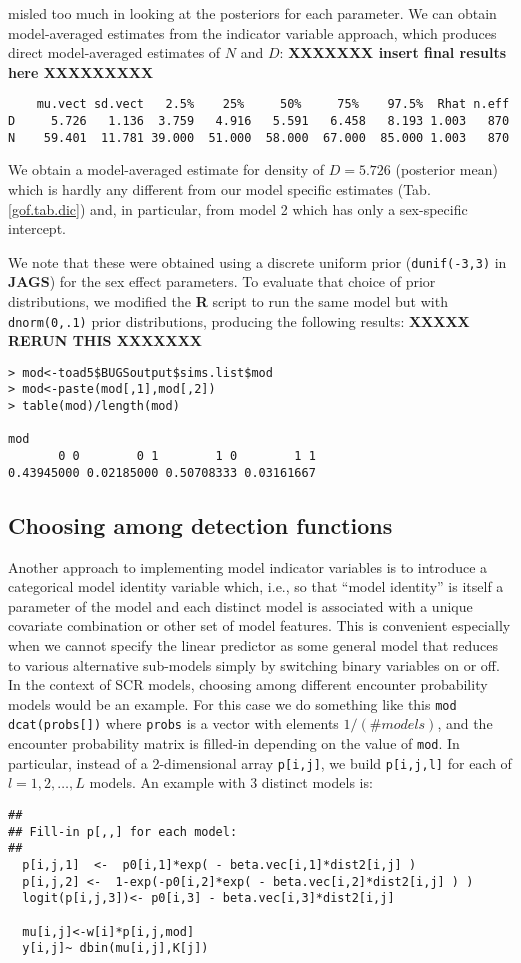 misled too much in looking at the posteriors for each parameter.
We can obtain model-averaged estimates from the indicator variable
approach, which 
 produces direct model-averaged estimates of $N$ and $D$: {\bf XXXXXXX
   insert final results here XXXXXXXXX}
{\small
\begin{verbatim}
    mu.vect sd.vect   2.5%    25%     50%     75%    97.5%  Rhat n.eff
D     5.726   1.136  3.759   4.916   5.591   6.458   8.193 1.003   870
N    59.401  11.781 39.000  51.000  58.000  67.000  85.000 1.003   870
\end{verbatim}
}
We obtain a model-averaged estimate for density of $D=5.726$
(posterior mean) which is hardly any different from our
model specific estimates (Tab. \ref{gof.tab.dic}) and, in particular, from model 2
which has only a sex-specific intercept. 


We note that these were obtained using a discrete uniform prior
(\mbox{\tt dunif(-3,3)} in {\bf JAGS})
for the sex effect parameters. To evaluate that choice of prior
distributions, we modified the {\bf R} script to run the same model
but with \mbox{\tt dnorm(0,.1)} prior distributions, producing the
following results:  {\bf XXXXX RERUN THIS XXXXXXX}
\begin{verbatim}
> mod<-toad5$BUGSoutput$sims.list$mod
> mod<-paste(mod[,1],mod[,2])
> table(mod)/length(mod)

mod
       0 0        0 1        1 0        1 1
0.43945000 0.02185000 0.50708333 0.03161667
\end{verbatim}


\subsection{Choosing among detection functions}



Another approach to implementing model indicator variables is to
introduce a categorical model identity variable which, i.e., so that
``model identity'' is itself a parameter of the model and each
distinct model is associated with a unique covariate combination or
other set of model features. This is convenient especially when we
cannot specify the linear predictor as some general model that reduces
to various alternative sub-models simply by switching binary variables
on or off. In the context of SCR models, choosing among different
encounter probability models would be an example.  For this case we do
something like this \mbox{\tt mod ~  dcat(probs[])}
where \mbox{\tt probs} is a vector with elements $1/(\# models)$, and
the encounter probability matrix is filled-in depending on the value 
 of \mbox{\tt mod}. 
In particular, instead of a 2-dimensional array
 \mbox{\tt p[i,j]},  we build \mbox{\tt p[i,j,l]} for each of
$l=1,2,\ldots,L$ models. An example with 3 distinct models is:
\begin{verbatim}
##
## Fill-in p[,,] for each model:
##
  p[i,j,1]  <-  p0[i,1]*exp( - beta.vec[i,1]*dist2[i,j] )
  p[i,j,2] <-  1-exp(-p0[i,2]*exp( - beta.vec[i,2]*dist2[i,j] ) )
  logit(p[i,j,3])<- p0[i,3] - beta.vec[i,3]*dist2[i,j]

  mu[i,j]<-w[i]*p[i,j,mod]
  y[i,j]~ dbin(mu[i,j],K[j])
\end{verbatim}

